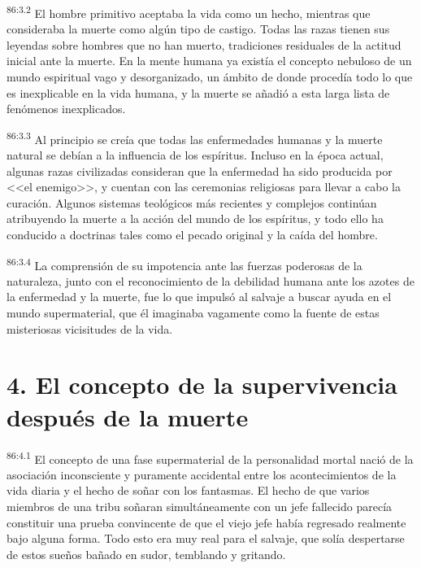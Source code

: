 \par
\textsuperscript{86:3.2} El hombre primitivo aceptaba la vida como un hecho, mientras que consideraba la muerte como algún tipo de castigo. Todas las razas tienen sus leyendas sobre hombres que no han muerto, tradiciones residuales de la actitud inicial ante la muerte. En la mente humana ya existía el concepto nebuloso de un mundo espiritual vago y desorganizado, un ámbito de donde procedía todo lo que es inexplicable en la vida humana, y la muerte se añadió a esta larga lista de fenómenos inexplicados.

\par
\textsuperscript{86:3.3} Al principio se creía que todas las enfermedades humanas y la muerte natural se debían a la influencia de los espíritus. Incluso en la época actual, algunas razas civilizadas consideran que la enfermedad ha sido producida por <<el enemigo>>, y cuentan con las ceremonias religiosas para llevar a cabo la curación. Algunos sistemas teológicos más recientes y complejos continúan atribuyendo la muerte a la acción del mundo de los espíritus, y todo ello ha conducido a doctrinas tales como el pecado original y la caída del hombre.

\par
\textsuperscript{86:3.4} La comprensión de su impotencia ante las fuerzas poderosas de la naturaleza, junto con el reconocimiento de la debilidad humana ante los azotes de la enfermedad y la muerte, fue lo que impulsó al salvaje a buscar ayuda en el mundo supermaterial, que él imaginaba vagamente como la fuente de estas misteriosas vicisitudes de la vida.

\section*{4. El concepto de la supervivencia después de la muerte}
\par
\textsuperscript{86:4.1} El concepto de una fase supermaterial de la personalidad mortal nació de la asociación inconsciente y puramente accidental entre los acontecimientos de la vida diaria y el hecho de soñar con los fantasmas. El hecho de que varios miembros de una tribu soñaran simultáneamente con un jefe fallecido parecía constituir una prueba convincente de que el viejo jefe había regresado realmente bajo alguna forma. Todo esto era muy real para el salvaje, que solía despertarse de estos sueños bañado en sudor, temblando y gritando.


